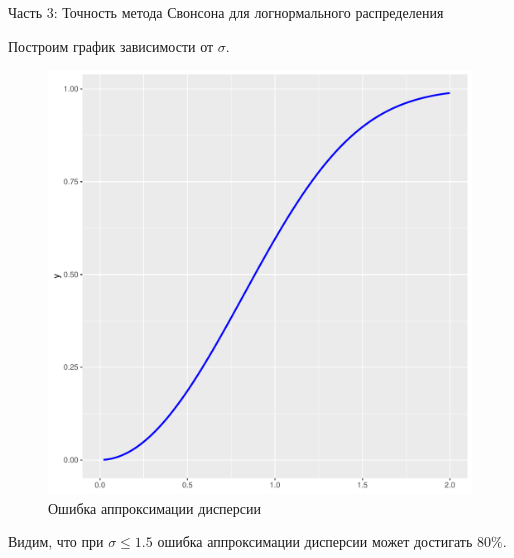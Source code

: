 \documentclass[ucs, notheorems, handout]{beamer}
\begin{document}
\begin{frame}{Часть 3: Точность метода Свонсона для логнормального распределения}
	
Построим график зависимости от $\sigma$.

	\begin{figure}[h]
	\begin{center}
		\begin{minipage}[h]{0.5\linewidth}
			\includegraphics[width=1\linewidth]{img/s_sig.pdf}
			\caption{Ошибка аппроксимации дисперсии} %
			\label{ris:image2} %
		\end{minipage}
		
	\end{center}
\end{figure}

Видим, что при $\sigma\leq1.5$ ошибка аппроксимации дисперсии может достигать $80\%$. 
	
\end{frame}
	
\end{document}
